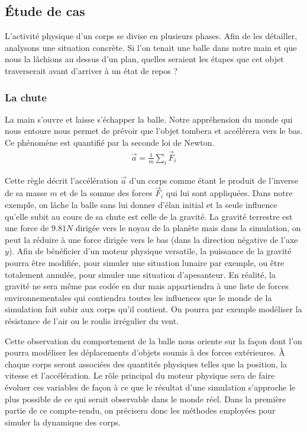 \subsection{\'Etude de cas}

L'activité physique d'un corps se divise en plusieurs phases. Afin de
les détailler, analysons une situation concrète. Si l'on tenait une
balle dans notre main et que nous la lâchions au dessus d'un plan,
quelles seraient les étapes que cet objet traverserait avant d'arriver
à un état de repos ?

\subsubsection{La chute}

La main s'ouvre et laisse s'échapper la balle. Notre appréhension du
monde qui nous entoure nous permet de prévoir que l'objet tombera et
accélérera vers le bas. Ce phénomène est quantifié par la seconde loi
de Newton.
\begin{align*}
  \vec{a} = \frac{1}{m} \sum_i \vec{F}_i
\end{align*}

Cette règle décrit l'accélération $\vec{a}$ d'un corps comme étant le
produit de l'inverse de sa masse $m$ et de la somme des forces
$\vec{F}_i$ qui lui sont appliquées. Dans notre exemple, on lâche la
balle sans lui donner d'élan initial et la seule influence qu'elle
subit au cours de sa chute est celle de la gravité. La gravité
terrestre est une force de $9.81 N$ dirigée vers le noyau de la
planète mais dans la simulation, on peut la réduire à une force
dirigée vers le bas (dans la direction négative de l'axe $y$). Afin de
bénéficier d'un moteur physique versatile, la puissance de la gravité
pourra être modifiée, pour simuler une situation lunaire par exemple,
ou être totalement annulée, pour simuler une situation
d'apesanteur. En réalité, la gravité ne sera même pas codée \og en dur
\fg{} mais appartiendra à une liste de forces environnementales qui
contiendra toutes les influences que le monde de la simulation fait
subir aux corps qu'il contient. On pourra par exemple modéliser la
résistance de l'air ou le roulis irrégulier du vent.

Cette observation du comportement de la balle nous oriente sur la
façon dont l'on pourra modéliser les déplacements d'objets soumis à
des forces extérieures. \`A chaque corps seront associées des
quantités physiques telles que la position, la vitesse et
l'accélération. Le rôle principal du moteur physique sera de faire
évoluer ces variables de façon à ce que le résultat d'une simulation
s'approche le plus possible de ce qui serait observable dans le monde
réel. Dans la première partie de ce compte-rendu, on précisera donc
les méthodes employées pour simuler la dynamique des corps.

